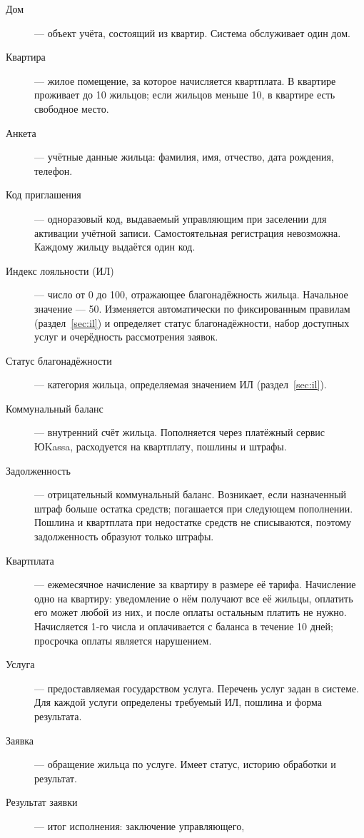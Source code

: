 \documentclass[12pt,a4paper]{article}
\begin{document}
\begin{description}
  \item[Дом] --- объект учёта, состоящий из квартир. Система обслуживает
    один дом.
  \item[Квартира] --- жилое помещение, за которое начисляется квартплата.
    В квартире проживает до 10 жильцов; если жильцов меньше 10, в квартире
    есть свободное место.
  \item[Анкета] --- учётные данные жильца: фамилия, имя, отчество, дата
    рождения, телефон.
  \item[Код приглашения] --- одноразовый код, выдаваемый управляющим при
    заселении для активации учётной записи. Самостоятельная регистрация
    невозможна. Каждому жильцу выдаётся один код.
  \item[Индекс лояльности (ИЛ)] --- число от 0 до 100, отражающее
    благонадёжность жильца. Начальное значение --- 50. Изменяется
    автоматически по фиксированным правилам (раздел~\ref{sec:il}) и определяет
    статус благонадёжности, набор доступных услуг и очерёдность
    рассмотрения заявок.
  \item[Статус благонадёжности] --- категория жильца, определяемая
    значением ИЛ (раздел~\ref{sec:il}).
  \item[Коммунальный баланс] --- внутренний счёт жильца. Пополняется через
    платёжный сервис ЮKassa, расходуется на квартплату, пошлины и штрафы.
  \item[Задолженность] --- отрицательный коммунальный баланс. Возникает,
    если назначенный штраф больше остатка средств; погашается при
    следующем пополнении. Пошлина и квартплата при недостатке средств не
    списываются, поэтому задолженность образуют только штрафы.
  \item[Квартплата] --- ежемесячное начисление за квартиру в размере её
    тарифа. Начисление одно на квартиру: уведомление о нём получают все её
    жильцы, оплатить его может любой из них, и после оплаты остальным
    платить не нужно. Начисляется 1-го числа и оплачивается с баланса
    в течение 10 дней; просрочка оплаты является нарушением.
  \item[Услуга] --- предоставляемая государством услуга. Перечень услуг
    задан в системе. Для каждой услуги определены требуемый ИЛ, пошлина и
    форма результата.
  \item[Заявка] --- обращение жильца по услуге. Имеет статус, историю
    обработки и результат.
  \item[Результат заявки] --- итог исполнения: заключение управляющего,

\end{description}
\end{document}

